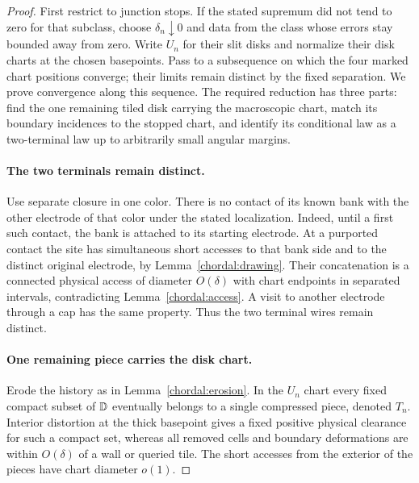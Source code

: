\begin{proof}
First restrict to junction stops.  If the stated supremum did not
tend to zero for that subclass, choose $\delta_n\downarrow0$ and
data from the class whose errors stay bounded away from zero.
Write $U_n$ for their slit disks and normalize their disk charts at
the chosen basepoints.  Pass to a subsequence on which the four
marked chart positions converge; their limits remain distinct by
the fixed separation.  We prove convergence along this sequence.
The required reduction has three parts: find the one remaining tiled
disk carrying the macroscopic chart, match its boundary incidences to
the stopped chart, and identify its conditional law as a two-terminal
law up to arbitrarily small angular margins.

\paragraph{The two terminals remain distinct.}
Use separate closure in one color.
There is no contact of its known bank with the other electrode of
that color under the stated localization.  Indeed, until a first
such contact, the bank is attached to its starting electrode.
At a purported contact the site has simultaneous short accesses
to that bank side and to the distinct original electrode, by
Lemma~\ref{chordal:drawing}.  Their concatenation is a connected
physical access of diameter $O(\delta)$ with chart endpoints in
separated intervals, contradicting Lemma~\ref{chordal:access}.
A visit to another electrode through a cap has the same property.
Thus the two terminal wires remain distinct.

\paragraph{One remaining piece carries the disk chart.}
Erode the history as in Lemma~\ref{chordal:erosion}.  In the
$U_n$ chart every fixed compact subset of $\mathbb D$ eventually belongs
to a single compressed piece, denoted $T_n$.  Interior distortion
at the thick basepoint gives a fixed positive physical clearance
for such a compact set, whereas all removed cells and boundary
deformations are within $O(\delta)$ of a wall or queried tile.
The short accesses from the exterior of the pieces have chart
diameter $o(1)$.


\end{proof}
